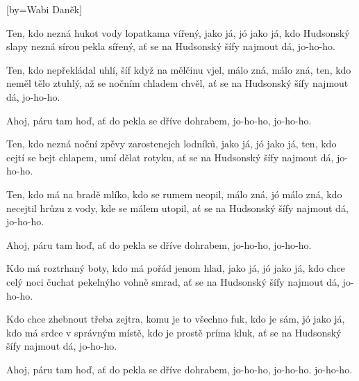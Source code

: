 [by={Wabi Daněk}]

\beginverse{}
Ten, kdo nezná hukot vody lopatkama vířený,
jako já, jó jako já,
kdo Hudsonský slapy nezná sírou pekla sířený,
ať se na Hudsonský šífy najmout dá, jo-ho-ho.
\endverse{}

\beginverse{}
Ten, kdo nepřekládal uhlí, šíf když na mělčinu vjel,
málo zná, málo zná,
ten, kdo neměl tělo ztuhlý, až se nočním chladem chvěl,
ať se na Hudsonský šífy najmout dá, jo-ho-ho.
\endverse{}

\beginchorus{}
Ahoj, páru tam hoď, ať do pekla se dříve dohrabem,
jo-ho-ho, jo-ho-ho.
\endchorus{}

\beginverse{}
Ten, kdo nezná noční zpěvy zarostenejch lodníků,
jako já, jó jako já,
ten, kdo cejtí se bejt chlapem, umí dělat rotyku,
ať se na Hudsonský šífy najmout dá, jo-ho-ho.
\endverse{}

\beginverse{}
Ten, kdo má na bradě mlíko, kdo se rumem neopil,
málo zná, jó málo zná,
kdo necejtil hrůzu z vody, kde se málem utopil,
ať se na Hudsonský šífy najmout dá, jo-ho-ho.
\endverse{}

\beginchorus{}
Ahoj, páru tam hoď, ať do pekla se dříve dohrabem,
jo-ho-ho, jo-ho-ho.
\endchorus{}

\beginverse{}
Kdo má roztrhaný boty, kdo má pořád jenom hlad,
jako já, jó jako já,
kdo chce celý noci čuchat pekelnýho vohně smrad,
ať se na Hudsonský šífy najmout dá, jo-ho-ho.
\endverse{}

\beginverse{}
Kdo chce zhebnout třeba zejtra, komu je to všechno fuk,
kdo je sám, jó jako já,
kdo má srdce v správným místě, kdo je prostě príma kluk,
ať se na Hudsonský šífy najmout dá, jo-ho-ho.
\endverse{}

\beginchorus{}
Ahoj, páru tam hoď, ať do pekla se dříve dohrabem,
jo-ho-ho, jo-ho-ho.
jo-ho-ho.
\endchorus{}

\endsong{}
